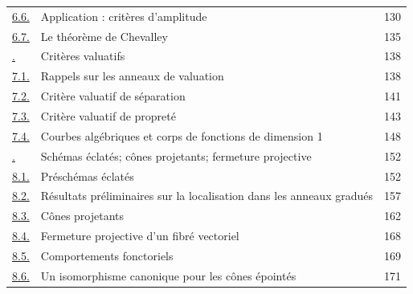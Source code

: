 \begin{longtable}{@{}p{}p{}r@{}}
\hyperref[subsection:II.6.6-fr]{6.6.} & Application : critères d'amplitude & 130\\
\hyperref[subsection:II.6.7-fr]{6.7.} & Le théorème de Chevalley & 135\\
\hyperref[section:II.7-fr]{\textsection7.} & Critères valuatifs & 138\\
\hyperref[subsection:II.7.1-fr]{7.1.} & Rappels sur les anneaux de valuation & 138\\
\hyperref[subsection:II.7.2-fr]{7.2.} & Critère valuatif de séparation & 141\\
\hyperref[subsection:II.7.3-fr]{7.3.} & Critère valuatif de propreté & 143\\
\hyperref[subsection:II.7.4-fr]{7.4.} & Courbes algébriques et corps de fonctions de dimension 1 & 148\\
\hyperref[section:II.8-fr]{\textsection8.} & Schémas éclatés; cônes projetants; fermeture projective & 152\\
\hyperref[subsection:II.8.1-fr]{8.1.} & Préschémas éclatés & 152\\
\hyperref[subsection:II.8.2-fr]{8.2.} & Résultats préliminaires sur la localisation dans les anneaux gradués & 157\\
\hyperref[subsection:II.8.3-fr]{8.3.} & Cônes projetants & 162\\
\hyperref[subsection:II.8.4-fr]{8.4.} & Fermeture projective d'un fibré vectoriel & 168\\
\hyperref[subsection:II.8.5-fr]{8.5.} & Comportements fonctoriels & 169\\
\hyperref[subsection:II.8.6-fr]{8.6.} & Un isomorphisme canonique pour les cônes épointés & 171\\
\end{longtable}
